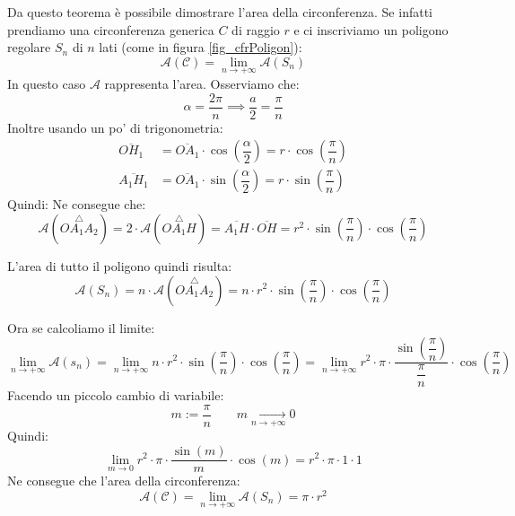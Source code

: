 Da questo teorema è possibile dimostrare l'area della circonferenza. Se infatti prendiamo una circonferenza generica $C$ di raggio $r$ e ci inscriviamo un poligono regolare $S_n$ di $n$ lati (come in figura \ref{fig_cfrPoligon}):
\begin{equation*}
	\mathcal{A}(\mathcal{C}) = \lim_{n \to + \infty} \mathcal{A} (S_n)
\end{equation*}
In questo caso $\mathcal{A}$ rappresenta l'area. Osserviamo che:
\begin{equation*}
	\alpha = \dfrac{2\pi}{n} \implies \dfrac{a}{2}= \dfrac{\pi}{n}
\end{equation*}
Inoltre usando un po' di trigonometria:
\begin{align*}
	\overline{OH_1} &= \overline{OA_1} \cdot \cos \left( \dfrac{\alpha}{2}\right) = r \cdot \cos \left(\dfrac{\pi}{n}\right)\\[5pt]
	\overline{A_1H_1} &= \overline{OA_1} \cdot \sin \left( \dfrac{\alpha}{2}\right) = r \cdot \sin \left(\dfrac{\pi}{n}\right)
\end{align*}
Quindi:
Ne consegue che:
\begin{equation*}
	\mathcal{A} (\stackrel{\triangle}{OA_1A_2}) = 2 \cdot \mathcal{A} (\stackrel{\triangle}{OA_1H}) = \overline{A_1H} \cdot \overline{OH} = r^2 \cdot \sin \left(\dfrac{\pi}{n} \right) \cdot \cos \left(\dfrac{\pi}{n} \right)
\end{equation*}

L'area di tutto il poligono quindi risulta:
\begin{equation*}
	\mathcal{A} (S_n) = n \cdot \mathcal{A} (\stackrel{\triangle}{OA_1A_2}) = n \cdot r^2 \cdot \sin \left(\dfrac{\pi}{n} \right) \cdot \cos \left(\dfrac{\pi}{n} \right)
\end{equation*}

Ora se calcoliamo il limite:
\begin{equation*}
	\lim_{n \to + \infty} \mathcal{A}(s_n) = \lim_{n \to + \infty} n \cdot r^2 \cdot \sin \left(\dfrac{\pi}{n} \right) \cdot \cos \left(\dfrac{\pi}{n} \right) = \lim_{n \to + \infty} r^2 \cdot \pi \cdot \dfrac{\sin \left(\dfrac{\pi}{n} \right)}{\dfrac{\pi}{n}} \cdot \cos \left(\dfrac{\pi}{n} \right)
\end{equation*}
Facendo un piccolo cambio di variabile:
\begin{equation*}
	m := \dfrac{\pi}{n} \qquad m \xrightarrow[n \to +\infty]{} 0
\end{equation*}
Quindi:
\begin{equation*}
	\lim_{m \to 0} r^2 \cdot \pi \cdot \dfrac{\sin(m)}{m} \cdot \cos (m) =  r^2 \cdot \pi \cdot 1 \cdot 1
\end{equation*}
Ne consegue che l'area della circonferenza:
\begin{equation*}
	\mathcal{A}(\mathcal{C}) = \lim_{n \to + \infty} \mathcal{A} (S_n) = \pi \cdot r^2
\end{equation*}




